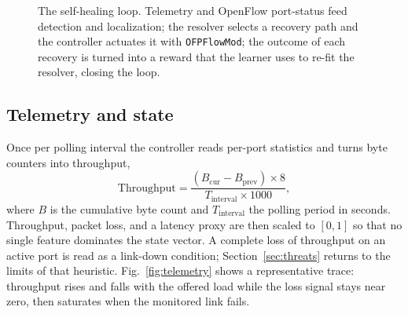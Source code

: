 \documentclass[conference]{IEEEtran}
\begin{document}
\begin{figure}[t]
\centering
{}
\caption{The self-healing loop. Telemetry and OpenFlow port-status feed detection and
localization; the resolver selects a recovery path and the controller actuates it with
\texttt{OFPFlowMod}; the outcome of each recovery is turned into a reward that the
learner uses to re-fit the resolver, closing the loop.}
\label{fig:arch}
\end{figure}

\subsection{Telemetry and state}
Once per polling interval the controller reads per-port statistics and turns byte
counters into throughput,
\begin{equation}
\text{Throughput} = \frac{(B_{\text{cur}} - B_{\text{prev}})\times 8}
{T_{\text{interval}}\times 1000},
\end{equation}
where $B$ is the cumulative byte count and $T_{\text{interval}}$ the polling period
in seconds. Throughput, packet loss, and a latency proxy are then scaled to $[0,1]$
so that no single feature dominates the state vector. A complete loss of throughput
on an active port is read as a link-down condition; Section~\ref{sec:threats}
returns to the limits of that heuristic. Fig.~\ref{fig:telemetry} shows a
representative trace: throughput rises and falls with the offered load while the loss
signal stays near zero, then saturates when the monitored link fails.
\end{document}
